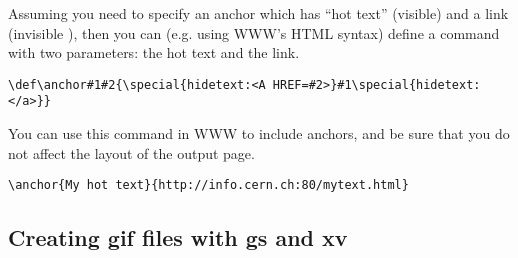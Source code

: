 Assuming you need to specify an anchor which has  ``hot text'' (visible) and
a link (invisible ), then you can (e.g. using WWW's HTML syntax)
define a command  with
two parameters: the hot text and the link.
 
\begin{verbatim}
\def\anchor#1#2{\special{hidetext:<A HREF=#2>}#1\special{hidetext:</a>}}
\end{verbatim}
 
You can use this command in WWW to include anchors, and
be sure that you do not affect the layout of the output page.
\begin{verbatim}
\anchor{My hot text}{http://info.cern.ch:80/mytext.html}
\end{verbatim}

\subsection{Creating gif files with gs and xv}
\label{sec:epstogif}








